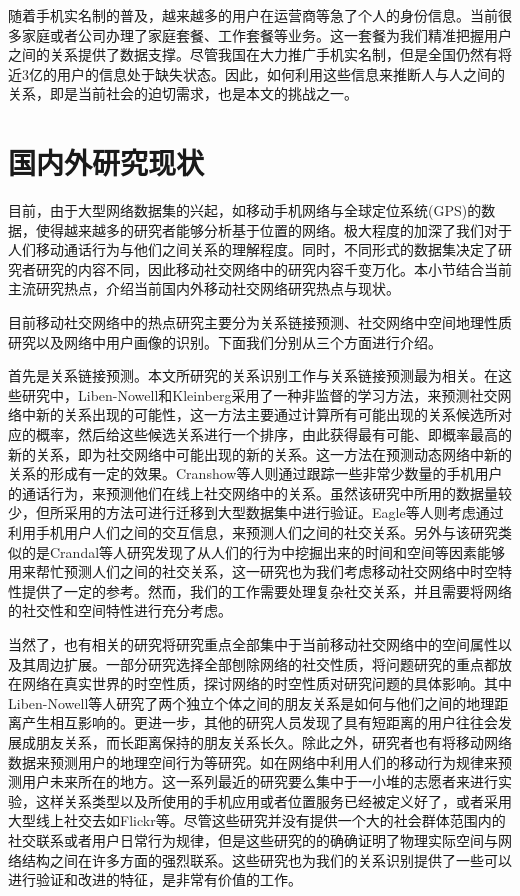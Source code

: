 随着手机实名制的普及，越来越多的用户在运营商等急了个人的身份信息。当前很多家庭或者公司办理了家庭套餐、工作套餐等业务。这一套餐为我们精准把握用户之间的关系提供了数据支撑。尽管我国在大力推广手机实名制，但是全国仍然有将近3亿的用户的信息处于缺失状态。因此，如何利用这些信息来推断人与人之间的关系，即是当前社会的迫切需求，也是本文的挑战之一。


\section{国内外研究现状}

目前，由于大型网络数据集的兴起，如移动手机网络与全球定位系统(GPS)的数据，使得越来越多的研究者能够分析基于位置的网络。极大程度的加深了我们对于人们移动通话行为与他们之间关系的理解程度。同时，不同形式的数据集决定了研究者研究的内容不同，因此移动社交网络中的研究内容千变万化。本小节结合当前主流研究热点，介绍当前国内外移动社交网络研究热点与现状。

目前移动社交网络中的热点研究主要分为关系链接预测、社交网络中空间地理性质研究以及网络中用户画像的识别。下面我们分别从三个方面进行介绍。

首先是关系链接预测。本文所研究的关系识别工作与关系链接预测最为相关。在这些研究中，Liben-Nowell和Kleinberg采用了一种非监督的学习方法，来预测社交网络中新的关系出现的可能性，这一方法主要通过计算所有可能出现的关系候选所对应的概率，然后给这些候选关系进行一个排序，由此获得最有可能、即概率最高的新的关系，即为社交网络中可能出现的新的关系。这一方法在预测动态网络中新的关系的形成有一定的效果。Cranshow等人则通过跟踪一些非常少数量的手机用户的通话行为，来预测他们在线上社交网络中的关系。虽然该研究中所用的数据量较少，但所采用的方法可进行迁移到大型数据集中进行验证。Eagle等人则考虑通过利用手机用户人们之间的交互信息，来预测人们之间的社交关系。另外与该研究类似的是Crandal等人研究发现了从人们的行为中挖掘出来的时间和空间等因素能够用来帮忙预测人们之间的社交关系，这一研究也为我们考虑移动社交网络中时空特性提供了一定的参考。然而，我们的工作需要处理复杂社交关系，并且需要将网络的社交性和空间特性进行充分考虑。


当然了，也有相关的研究将研究重点全部集中于当前移动社交网络中的空间属性以及其周边扩展。一部分研究选择全部刨除网络的社交性质，将问题研究的重点都放在网络在真实世界的时空性质，探讨网络的时空性质对研究问题的具体影响。其中Liben-Nowell等人研究了两个独立个体之间的朋友关系是如何与他们之间的地理距离产生相互影响的。更进一步，其他的研究人员发现了具有短距离的用户往往会发展成朋友关系，而长距离保持的朋友关系长久。除此之外，研究者也有将移动网络数据来预测用户的地理空间行为等研究。如在网络中利用人们的移动行为规律来预测用户未来所在的地方。这一系列最近的研究要么集中于一小堆的志愿者来进行实验，这样关系类型以及所使用的手机应用或者位置服务已经被定义好了，或者采用大型线上社交去如Flickr等。尽管这些研究并没有提供一个大的社会群体范围内的社交联系或者用户日常行为规律，但是这些研究的的确确证明了物理实际空间与网络结构之间在许多方面的强烈联系。这些研究也为我们的关系识别提供了一些可以进行验证和改进的特征，是非常有价值的工作。

